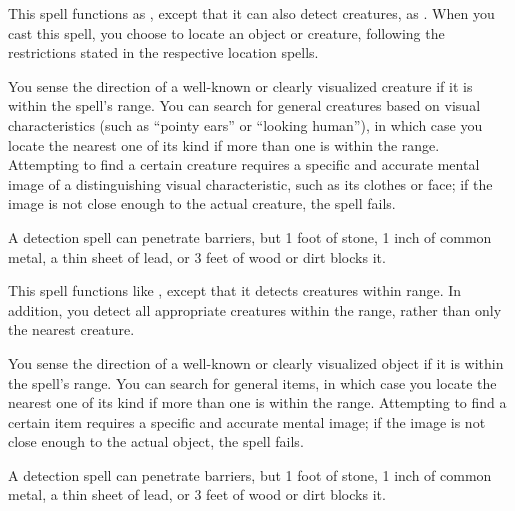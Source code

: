 \spellrng{\rngext}
\spelldur{\durlong \dismissable}
\begin{spelleffect}
    This spell functions as , except that it can also detect creatures, as . When you cast this spell, you choose to locate an object or creature, following the restrictions stated in the respective location spells.
\end{spelleffect}

\spellrng{\rngmed}
\spelldur{\durmed \dismissable}
\begin{spelleffect}
    You sense the direction of a well-known or clearly visualized creature if it is within the spell's range. You can search for general creatures based on visual characteristics (such as ``pointy ears'' or ``looking human''), in which case you locate the nearest one of its kind if more than one is within the range. Attempting to find a certain creature requires a specific and accurate mental image of a distinguishing visual characteristic, such as its clothes or face; if the image is not close enough to the actual creature, the spell fails.
\end{spelleffect}
\begin{spellnotes}
    A detection spell can penetrate barriers, but 1 foot of stone, 1 inch of common metal, a thin sheet of lead, or 3 feet of wood or dirt blocks it.
\end{spellnotes}

\spellrng{\rngext}
\begin{spelleffect}
    This spell functions like , except that it detects creatures within \rngext range. In addition, you detect all appropriate creatures within the range, rather than only the nearest creature.
\end{spelleffect}

\spellrng{\rngmed}
\spelldur{\durmed \dismissable}
\begin{spelleffect}
    You sense the direction of a well-known or clearly visualized object if it is within the spell's range. You can search for general items, in which case you locate the nearest one of its kind if more than one is within the range. Attempting to find a certain item requires a specific and accurate mental image; if the image is not close enough to the actual object, the spell fails.
\end{spelleffect}
\begin{spellnotes}
    A detection spell can penetrate barriers, but 1 foot of stone, 1 inch of common metal, a thin sheet of lead, or 3 feet of wood or dirt blocks it.
\end{spellnotes}

